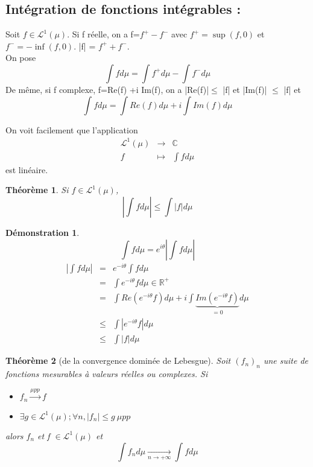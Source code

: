 \documentclass{article}
\theoremstyle{mes_theoremes}
\newtheorem{theo}{Théorème}[section]
\newtheorem*{dem}{Démonstration}
\begin{document}
\subsection*{Intégration de fonctions intégrables : \\}
Soit $f\in \mathcal{L}^1(\mu)$. Si f réelle, on a f=$f^+ - f^-$ avec $f^+ = \sup (f,0)$ et $f^- = -\inf (f,0)$. |f| = $f^+ + f^-$. \\
On pose \[\int f d\mu = \int f^+ d\mu - \int f^- d\mu\]
De même, si f complexe, f=Re(f) +i Im(f), on a |Re(f)|$\leq$ |f| et |Im(f)| $\leq$ |f| et \[\int f d\mu = \int Re(f) d\mu + i\int Im(f) d\mu\]

On voit facilement que l'application \begin{eqnarray*} \mathcal{L}^1(\mu) &\rightarrow& \mathbb{C} \\ f &\mapsto& \int f d\mu \end{eqnarray*} est linéaire.

\begin{theo}
Si $f\in \mathcal{L}^1(\mu)$, \[\left| \int f d\mu \right| \leq \int |f| d\mu\]
\end{theo}

\begin{dem}
\[\int f d\mu = e^{i\theta} \left| \int f d\mu \right|\]
\begin{eqnarray*}
\left| \int f d\mu \right| &=& e^{-i\theta} \int f d\mu \\
&=& \int e^{-i\theta} f d\mu \in \mathbb{R}^+ \\
&=& \int Re(e^{-i\theta} f) d\mu + i \int \underbrace{Im(e^{-i\theta} f)}_{=0} d\mu \\
&\leq& \int |e^{-i\theta} f| d\mu \\
&\leq& \int |f| d\mu
\end{eqnarray*}
\end{dem}

\begin{theo}[de la convergence dominée de Lebesgue]
Soit $(f_n)_n$ une suite de fonctions mesurables à valeurs réelles ou complexes. Si \begin{itemize} \item $f_n \xrightarrow{\mu pp} f$ \item $\exists g\in \mathcal{L}^1(\mu); \forall n, |f_n|\leq g\ \mu pp$ \end{itemize} alors $f_n$ et f $\in \mathcal{L}^1(\mu)$ et \[\int f_n d\mu \xrightarrow[n \rightarrow +\infty]{} \int f d\mu\]
\end{theo}
\end{document}
